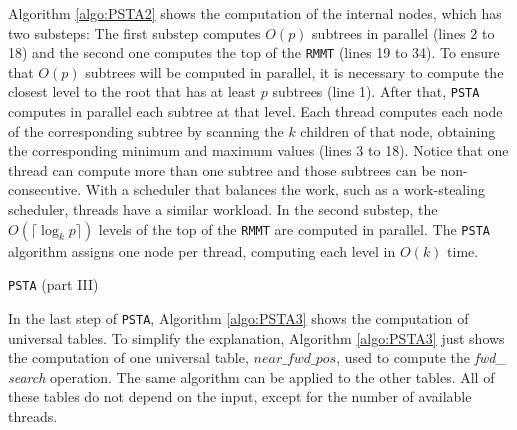 Algorithm \ref{algo:PSTA2} shows the computation of the internal
nodes, which has two substeps: The first substep computes $O(p)$
subtrees in parallel (lines 2 to 18) and the second one computes the
top of the {\tt RMMT} (lines 19 to 34). To ensure that $O(p)$ subtrees
will be computed in parallel, it is necessary to compute the closest
level to the root that has at least $p$ subtrees (line 1). After that,
{\tt PSTA} computes in parallel each subtree at that level. Each
thread computes each node of the corresponding subtree by scanning the
$k$ children of that node, obtaining the corresponding minimum and
maximum values (lines 3 to 18). Notice that one thread can compute
more than one subtree and those subtrees can be non-consecutive. With
a scheduler that balances the work, such as a work-stealing scheduler,
threads have a similar workload. In the second substep, the $O(\lceil
\log_{k}p \rceil)$ levels of the top of the {\tt RMMT} are computed in
parallel. The {\tt PSTA} algorithm assigns one node per thread,
computing each level in $O(k)$ time.


\begin{algorithm}[t]
\small
\SetVlineSkip{-2cm}
  \LinesNumbered
  \SetAlgoNoEnd
  \DontPrintSemicolon
  \BlankLine%


  \caption{{\tt PSTA} (part III)}
  \label{algo:PSTA3}
\end{algorithm}
\normalsize

In the last step of {\tt PSTA}, Algorithm \ref{algo:PSTA3} shows the computation of
universal tables. To simplify the explanation, Algorithm
\ref{algo:PSTA3} just shows the computation of one universal table,
$near\_fwd\_pos$, used to compute the \emph{fwd\_ search} operation. The same algorithm can be applied to the other
tables. All of these tables do not depend on the input, except for the
number of available threads.